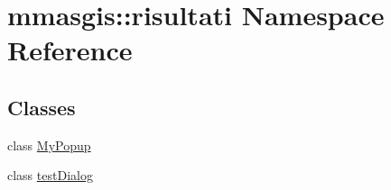 \hypertarget{namespacemmasgis_1_1risultati}{
\section{mmasgis::risultati Namespace Reference}
\label{namespacemmasgis_1_1risultati}
}
\subsection*{Classes}
\begin{DoxyCompactItemize}
\item 
class \hyperlink{classmmasgis_1_1risultati_1_1MyPopup}{MyPopup}
\item 
class \hyperlink{classmmasgis_1_1risultati_1_1testDialog}{testDialog}
\end{DoxyCompactItemize}
